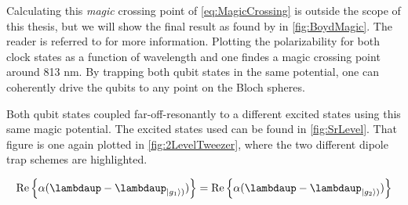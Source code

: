 Calculating this \textit{magic} crossing point of \cref{eq:MagicCrossing} is outside the scope of this thesis, but we will show the final result as found by \cite{Boyd2007} in \cref{fig:BoydMagic}. The reader is referred to \cite{Madjarov2020,Boyd2007} for more information. Plotting the polarizability for both clock states as a function of wavelength and one findes a magic crossing point around 813 nm. By trapping both qubit states in the same potential, one can coherently drive the qubits to any point on the Bloch spheres. 

Both qubit states coupled far-off-resonantly to a different excited states using this same magic potential. The excited states used can be found in \cref{fig:SrLevel}. That figure is one again plotted in \cref{fig:2LevelTweezer}, where the two different dipole trap schemes are highlighted.

\begin{equation}\label{eq:MagicCrossing}
    \operatorname{Re}\left\{\alpha(\lambdaup-\lambdaup_{\ket{g_1})})\right\} = 
    \operatorname{Re}\left\{\alpha(\lambdaup-\lambdaup_{\ket{g_2})})\right\}
\end{equation}





	

